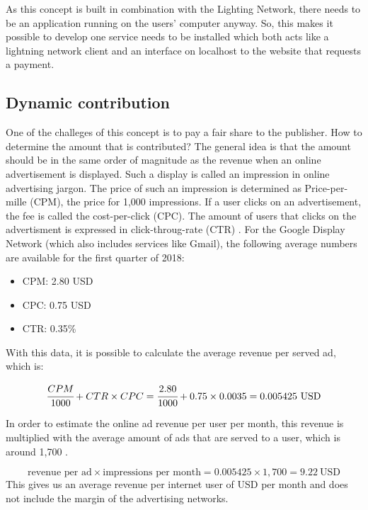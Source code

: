 As this concept is built in combination with the Lighting Network, there needs to be an application running on the users' computer anyway. So, this makes it possible to develop one service needs to be installed which both acts like a lightning network client and an interface on localhost to the website that requests a payment.

\subsection{Dynamic contribution}

One of the challeges of this concept is to pay a fair share to the publisher. How to determine the amount that is contributed? The general idea is that the amount should be in the same order of magnitude as the revenue when an online advertisement is displayed. Such a display is called an impression in online advertising jargon. The price of such an impression is determined as Price-per-mille (CPM), the price for 1,000 impressions. If a user clicks on an advertisement, the fee is called the cost-per-click (CPC). The amount of users that clicks on the advertisment is expressed in click-throug-rate (CTR) \cite{evans2009online}. For the Google Display Network (which also includes services like Gmail), the following average numbers are available for the first quarter of 2018: 

\begin{itemize}
  \item CPM: 2.80 USD
  \item CPC: 0.75 USD
  \item CTR: 0.35\%
\end{itemize}

\noindent With this data, it is possible to calculate the average revenue per served ad, which is:

\begin{equation}
\cfrac{CPM}{1000} + CTR \times CPC = \cfrac{2.80}{1000} + 0.75 \times 0.0035 = 0.005425 ~\text{USD}
\end{equation}

\noindent In order to estimate the online ad revenue per user per month, this revenue is multiplied with the average amount of ads that are served to a user, which is around 1,700 \cite{papadopoulos2018cost}. 

\begin{equation}
  \text{revenue per ad} \times \text{impressions per month} = 0.005425 \times 1,700 = 9.22 ~\text{USD}
\end{equation}
This gives us an average revenue per internet user of USD per month and does not include the margin of the advertising networks.







